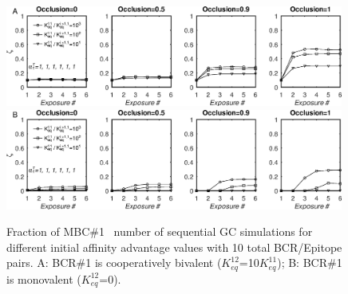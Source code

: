 \begin{figure}
\centering
\includegraphics[width=0.99\textwidth]{../fig8-S3-S8/mbctime-k12=10si.eps}
\includegraphics[width=0.99\textwidth]{../fig8-S3-S8/mbctime-k12=0si.eps}
\caption{Fraction of MBC\#1 \vs~number of sequential GC simulations for different initial affinity advantage values
 with 10 total BCR/Epitope pairs.
A: BCR\#1 is cooperatively bivalent ($K^{12}_{eq}$=10$K^{11}_{eq}$);
B: BCR\#1 is monovalent ($K^{12}_{eq}$=0).
}
\label{fig:mbctime}
\end{figure}

\vspace{1EM}
